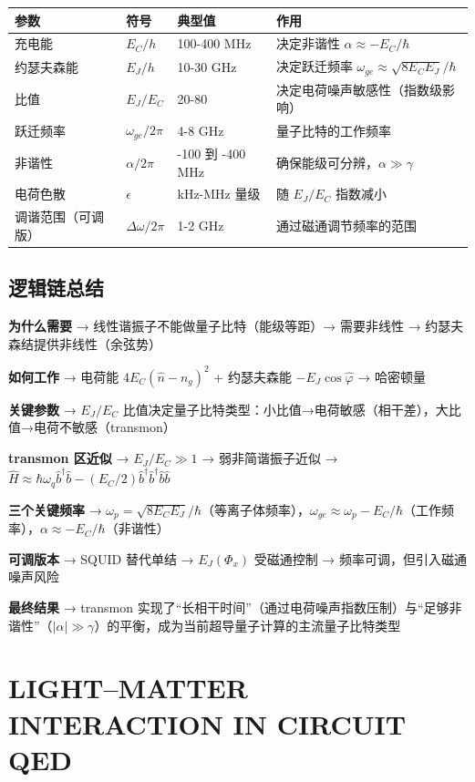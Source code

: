 \documentclass[12pt,a4paper,oneside]{ctexbook}
\begin{document}
\begin{longtable}[]{@{}llll@{}}
\toprule
参数 & 符号 & 典型值 & 作用\tabularnewline
\midrule
\endhead
充电能 & \(E_C/h\) & 100-400 MHz & 决定非谐性
\(\alpha \approx -E_C/\hbar\)\tabularnewline
约瑟夫森能 & \(E_J/h\) & 10-30 GHz & 决定跃迁频率
\(\omega_{ge} \approx \sqrt{8E_CE_J}/\hbar\)\tabularnewline
比值 & \(E_J/E_C\) & 20-80 &
决定电荷噪声敏感性（指数级影响）\tabularnewline
跃迁频率 & \(\omega_{ge}/2\pi\) & 4-8 GHz &
量子比特的工作频率\tabularnewline
非谐性 & \(\alpha/2\pi\) & -100 到 -400 MHz &
确保能级可分辨，\(\alpha \gg \gamma\)\tabularnewline
电荷色散 & \(\epsilon\) & kHz-MHz 量级 & 随 \(E_J/E_C\)
指数减小\tabularnewline
调谐范围（可调版） & \(\Delta\omega/2\pi\) & 1-2 GHz &
通过磁通调节频率的范围\tabularnewline
\bottomrule
\end{longtable}


\subsection{逻辑链总结}\label{ux903bux8f91ux94feux603bux7ed3-1}

\textbf{为什么需要} → 线性谐振子不能做量子比特（能级等距）→ 需要非线性 →
约瑟夫森结提供非线性（余弦势）

\textbf{如何工作} → 电荷能 \(4E_C(\hat n - n_g)^2\) + 约瑟夫森能
\(-E_J\cos\hat\varphi\) → 哈密顿量

\textbf{关键参数} → \(E_J/E_C\)
比值决定量子比特类型：小比值→电荷敏感（相干差），大比值→电荷不敏感（transmon）

\textbf{transmon 区近似} → \(E_J/E_C \gg 1\) → 弱非简谐振子近似 →
\(\hat H \approx \hbar\omega_q \hat b^\dagger \hat b - (E_C/2)\hat b^\dagger\hat b^\dagger\hat b\hat b\)

\textbf{三个关键频率} →
\(\omega_p = \sqrt{8E_CE_J}/\hbar\)（等离子体频率），\(\omega_{ge} \approx \omega_p - E_C/\hbar\)（工作频率），\(\alpha \approx -E_C/\hbar\)（非谐性）

\textbf{可调版本} → SQUID 替代单结 → \(E_J(\Phi_x)\) 受磁通控制 →
频率可调，但引入磁通噪声风险

\textbf{最终结果} → transmon
实现了``长相干时间''（通过电荷噪声指数压制）与``足够非谐性''（\(|\alpha| \gg \gamma\)）的平衡，成为当前超导量子计算的主流量子比特类型

\section{\texorpdfstring{\textbf{LIGHT--MATTER INTERACTION IN
CIRCUIT
QED}}{III. LIGHT--MATTER INTERACTION IN CIRCUIT QED}}\label{iii.-lightmatter-interaction-in-circuit-qed}
\end{document}
